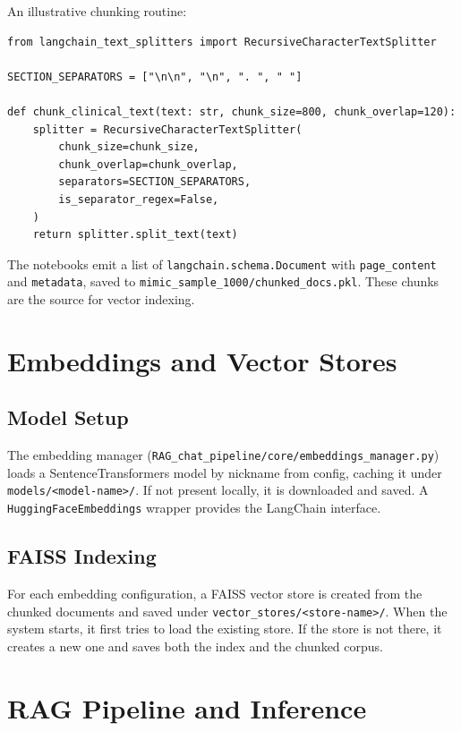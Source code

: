 \smallskip
\noindent An illustrative chunking routine:
\begin{verbatim}
from langchain_text_splitters import RecursiveCharacterTextSplitter

SECTION_SEPARATORS = ["\n\n", "\n", ". ", " "]

def chunk_clinical_text(text: str, chunk_size=800, chunk_overlap=120):
    splitter = RecursiveCharacterTextSplitter(
        chunk_size=chunk_size,
        chunk_overlap=chunk_overlap,
        separators=SECTION_SEPARATORS,
        is_separator_regex=False,
    )
    return splitter.split_text(text)
\end{verbatim}

\noindent The notebooks emit a list of \texttt{langchain.schema.Document} with \texttt{page\_content} and \texttt{metadata}, saved to \texttt{mimic\_sample\_1000/chunked\_docs.pkl}. These chunks are the source for vector indexing.

\section{Embeddings and Vector Stores}

\subsection{Model Setup}
The embedding manager (\texttt{RAG\_chat\_pipeline/core/embeddings\_manager.py}) loads a SentenceTransformers model by nickname from config, caching it under \texttt{models/<model-name>/}. If not present locally, it is downloaded and saved. A \texttt{HuggingFaceEmbeddings} wrapper provides the LangChain interface.

\subsection{FAISS Indexing}
For each embedding configuration, a FAISS vector store is created from the chunked documents and saved under \texttt{vector\_stores/<store-name>/}. When the system starts, it first tries to load the existing store. If the store is not there, it creates a new one and saves both the index and the chunked corpus.
\newpage
\section{RAG Pipeline and Inference}

